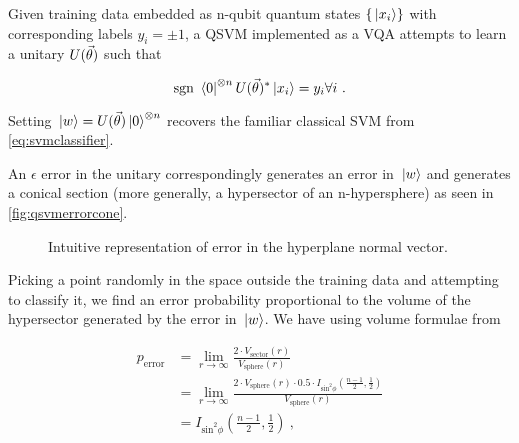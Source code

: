 
Given training data embedded as n-qubit quantum states \(\{\ket*{x_i}\}\) with
corresponding labels \({y_i = \pm 1}\), a QSVM implemented as a VQA attempts to learn a
unitary \(U(\vec{\theta})\) such that

\begin{equation}
    \text{sgn }{\bra*{0}^{\otimes n}U(\vec{\theta})^*\ket*{x_i}} = y_i \forall i~.
\end{equation}

Setting \(\ket*{w} = U(\vec{\theta})\ket*{0}^{\otimes n}\) recovers the
familiar classical SVM from \autoref{eq:svmclassifier}.

An \(\epsilon\) error in the unitary correspondingly generates an error in
\(\ket*{w}\) and generates a conical section (more generally, a hypersector of
an n-hypersphere) as seen in \autoref{fig:qsvmerrorcone}.

\begin{figure}[!ht]
    \centering
      \caption{Intuitive representation of error in the hyperplane normal vector.}
      \label{fig:qsvmerrorcone}
\end{figure}

Picking a point randomly in the space outside the training data and attempting
to classify it, we find an error probability proportional to the volume of the
hypersector generated by the error in \(\ket*{w}\). We have using volume
formulae from \cite{li2011concise}

\begin{align}
        p_{\text{error}} &= \lim_{r\to \infty}\frac{2\cdot V_{\text{sector}}(r)}{V_{\text{sphere}}(r)} \nonumber\\
            &= \lim_{r\to \infty}\frac{2\cdot V_{\text{sphere}}(r)\cdot 0.5\cdot I_{\text{sin}^2\phi}(\frac{n-1}{2}, \frac{1}{2})}{V_{\text{sphere}}(r)} \nonumber\\
            &= I_{\text{sin}^2\phi}(\frac{n-1}{2}, \frac{1}{2})~,
\end{align}

